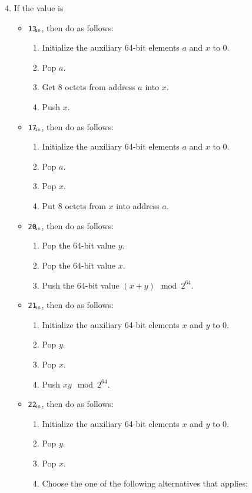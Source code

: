 \documentclass[a4paper,12pt]{article}
\newcommand{\num}[1]{\texttt{#1}\xspace}
\newcommand{\hex}[1]{\num{#1}$_{\textup{\tiny\hskip-1ex 16}}$\xspace}
\newcommand{\op}[1]{#1}
\newcommand{\LOADL}     [1]{\op{\hex{13}}}
\newcommand{\STOREL}    [1]{\op{\hex{17}}}
\newcommand{\ADD}       [1]{\op{\hex{20}}}
\newcommand{\MULT}      [1]{\op{\hex{21}}}
\newcommand{\DIV}       [1]{\op{\hex{22}}}
\begin{document}
\begin{enumerate}
  \setcounter{enumi}{3}
\item If the value is
  \begin{itemize}
  \item \LOADL{}, then do as follows:
    \begin{enumerate}
    \item Initialize the auxiliary 64-bit elements $a$ and $x$ to 0.
    \item Pop $a$.
    \item Get 8 octets from address $a$ into $x$.
    \item Push $x$.
    \end{enumerate}
  \item \STOREL{}, then do as follows:
    \begin{enumerate}
    \item Initialize the auxiliary 64-bit elements $a$ and $x$ to 0.
    \item Pop $a$.
    \item Pop $x$.
    \item Put 8 octets from $x$ into address $a$.
    \end{enumerate}
  \item \ADD{}, then do as follows:
    \begin{enumerate}
    \item Pop the 64-bit value $y$.
    \item Pop the 64-bit value $x$.
    \item Push the 64-bit value $(x + y) \mod 2^{64}$.
    \end{enumerate}
  \item \MULT{}, then do as follows:
    \begin{enumerate}
    \item Initialize the auxiliary 64-bit elements $x$ and $y$ to 0.
    \item Pop $y$.
    \item Pop $x$.
    \item Push $x y \mod 2^{64}$.
    \end{enumerate}
  \item \DIV{}, then do as follows:
    \begin{enumerate}
    \item Initialize the auxiliary 64-bit elements $x$ and $y$ to 0.
    \item Pop $y$.
    \item Pop $x$.
    \item Choose the one of the following alternatives that applies:

\end{enumerate}
\end{itemize}
\end{enumerate}
\end{document}
